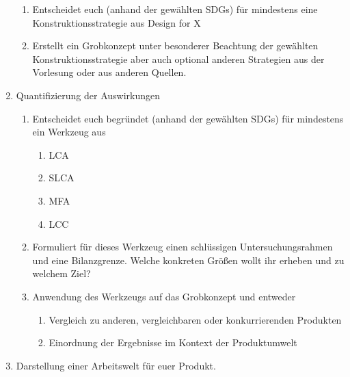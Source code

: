 \documentclass[DIV=15,headinclude=true]{scrreprt}
\begin{document}
\begin{enumerate}
	      \begin{enumerate}
		      \item
		            Entscheidet euch (anhand der gewählten SDGs) für mindestens eine
		            Konstruktionsstrategie aus Design for X
		      \item
		            Erstellt ein Grobkonzept unter besonderer Beachtung der gewählten
		            Konstruktionsstrategie aber auch optional anderen Strategien aus der
		            Vorlesung oder aus anderen Quellen.
	      \end{enumerate}
	\item
	      Quantifizierung der Auswirkungen

	      \begin{enumerate}
		      \item
		            Entscheidet euch begründet (anhand der gewählten SDGs) für
		            mindestens ein Werkzeug aus

		            \begin{enumerate}
			            \item
			                  LCA
			            \item
			                  SLCA
			            \item
			                  MFA
			            \item
			                  LCC
		            \end{enumerate}
		      \item
		            Formuliert für dieses Werkzeug einen schlüssigen Untersuchungsrahmen
		            und eine Bilanzgrenze. Welche konkreten Größen wollt ihr erheben und
		            zu welchem Ziel?
		      \item
		            Anwendung des Werkzeugs auf das Grobkonzept und entweder

		            \begin{enumerate}
			            \item
			                  Vergleich zu anderen, vergleichbaren oder konkurrierenden
			                  Produkten
			            \item
			                  Einordnung der Ergebnisse im Kontext der Produktumwelt
		            \end{enumerate}
	      \end{enumerate}
	\item
	      Darstellung einer Arbeitswelt für euer Produkt.


\end{enumerate}
\end{document}
